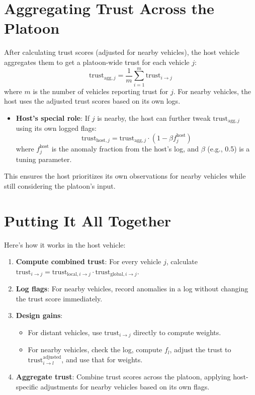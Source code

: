 \documentclass{article}
\begin{document}
\section{Aggregating Trust Across the Platoon}
After calculating trust scores (adjusted for nearby vehicles), the host vehicle aggregates them to get a platoon-wide trust for each vehicle \( j \):
\[
\text{trust}_{\text{agg}, j} = \frac{1}{m} \sum_{i=1}^{m} \text{trust}_{i \to j}
\]
where \( m \) is the number of vehicles reporting trust for \( j \). For nearby vehicles, the host uses the adjusted trust scores based on its own logs.

\begin{itemize}
    \item \textbf{Host's special role}: If \( j \) is nearby, the host can further tweak \( \text{trust}_{\text{agg}, j} \) using its own logged flags:
    \[
    \text{trust}_{\text{host}, j} = \text{trust}_{\text{agg}, j} \cdot (1 - \beta f_j^{\text{host}})
    \]
    where \( f_j^{\text{host}} \) is the anomaly fraction from the host's log, and \( \beta \) (e.g., 0.5) is a tuning parameter.
\end{itemize}

This ensures the host prioritizes its own observations for nearby vehicles while still considering the platoon's input.

\section{Putting It All Together}
Here's how it works in the host vehicle:
\begin{enumerate}
    \item \textbf{Compute combined trust}: For every vehicle \( j \), calculate \( \text{trust}_{i \to j} = \text{trust}_{\text{local}, i \to j} \cdot \text{trust}_{\text{global}, i \to j} \).
    \item \textbf{Log flags}: For nearby vehicles, record anomalies in a log without changing the trust score immediately.
    \item \textbf{Design gains}:
    \begin{itemize}
        \item For distant vehicles, use \( \text{trust}_{i \to j} \) directly to compute weights.
        \item For nearby vehicles, check the log, compute \( f_l \), adjust the trust to \( \text{trust}_{i \to l}^{\text{adjusted}} \), and use that for weights.
    \end{itemize}
    \item \textbf{Aggregate trust}: Combine trust scores across the platoon, applying host-specific adjustments for nearby vehicles based on its own flags.
\end{enumerate}
\end{document}
